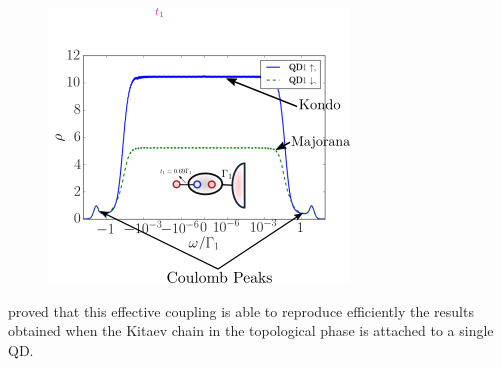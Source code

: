\begin{figure}[H]
\centering
\includegraphics[scale=0.7]{IMAGES/Majorana/NRG.png}

\caption{  \label{fig:NRG-1M} \protect{}}
\end{figure}


 \citeauthor{ruiz-tijerina_interaction_2015}  proved that this effective coupling  is able to reproduce efficiently the results obtained when the Kitaev chain in the topological phase is attached to a single QD. 








